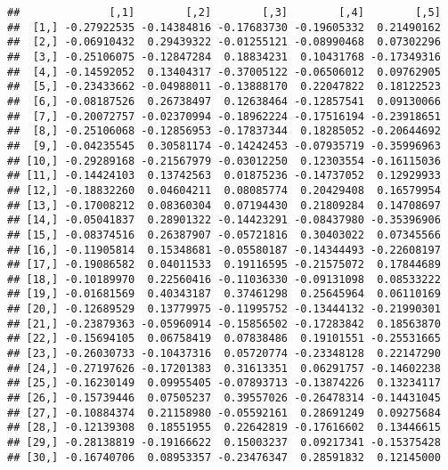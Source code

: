 \documentclass[
]{book}
\newenvironment{Shaded}{\begin{snugshade}}{\end{snugshade}}
\newcommand{\FunctionTok}[1]{\textcolor[rgb]{0.00,0.00,0.00}{#1}}
\newcommand{\NormalTok}[1]{#1}
\newcommand{\OtherTok}[1]{\textcolor[rgb]{0.56,0.35,0.01}{#1}}
\newcommand{\SpecialCharTok}[1]{\textcolor[rgb]{0.00,0.00,0.00}{#1}}
\begin{document}
\begin{verbatim}
##              [,1]        [,2]        [,3]        [,4]        [,5]
##  [1,] -0.27922535 -0.14384816 -0.17683730 -0.19605332  0.21490162
##  [2,] -0.06910432  0.29439322 -0.01255121 -0.08990468  0.07302296
##  [3,] -0.25106075 -0.12847284  0.18834231  0.10431768 -0.17349316
##  [4,] -0.14592052  0.13404317 -0.37005122 -0.06506012  0.09762905
##  [5,] -0.23433662 -0.04988011 -0.13888170  0.22047822  0.18122523
##  [6,] -0.08187526  0.26738497  0.12638464 -0.12857541  0.09130066
##  [7,] -0.20072757 -0.02370994 -0.18962224 -0.17516194 -0.23918651
##  [8,] -0.25106068 -0.12856953 -0.17837344  0.18285052 -0.20644692
##  [9,] -0.04235545  0.30581174 -0.14242453 -0.07935719 -0.35996963
## [10,] -0.29289168 -0.21567979 -0.03012250  0.12303554 -0.16115036
## [11,] -0.14424103  0.13742563  0.01875236 -0.14737052  0.12929933
## [12,] -0.18832260  0.04604211  0.08085774  0.20429408  0.16579954
## [13,] -0.17008212  0.08360304  0.07194430  0.21809284  0.14708697
## [14,] -0.05041837  0.28901322 -0.14423291 -0.08437980 -0.35396906
## [15,] -0.08374516  0.26387907 -0.05721816  0.30403022  0.07345566
## [16,] -0.11905814  0.15348681 -0.05580187 -0.14344493 -0.22608197
## [17,] -0.19086582  0.04011533  0.19116595 -0.21575072  0.17844689
## [18,] -0.10189970  0.22560416 -0.11036330 -0.09131098  0.08533222
## [19,] -0.01681569  0.40343187  0.37461298  0.25645964  0.06110169
## [20,] -0.12689529  0.13779975 -0.11995752 -0.13444132 -0.21990301
## [21,] -0.23879363 -0.05960914 -0.15856502 -0.17283842  0.18563870
## [22,] -0.15694105  0.06758419  0.07838486  0.19101551 -0.25531665
## [23,] -0.26030733 -0.10437316  0.05720774 -0.23348128  0.22147290
## [24,] -0.27197626 -0.17201383  0.31613351  0.06291757 -0.14602238
## [25,] -0.16230149  0.09955405 -0.07893713 -0.13874226  0.13234117
## [26,] -0.15739446  0.07505237  0.39557026 -0.26478314 -0.14431045
## [27,] -0.10884374  0.21158980 -0.05592161  0.28691249  0.09275684
## [28,] -0.12139308  0.18551955  0.22642819 -0.17616602  0.13446615
## [29,] -0.28138819 -0.19166622  0.15003237  0.09217341 -0.15375428
## [30,] -0.16740706  0.08953357 -0.23476347  0.28591832  0.12145000
\end{verbatim}

\begin{Shaded}
\end{Shaded}
\end{document}
